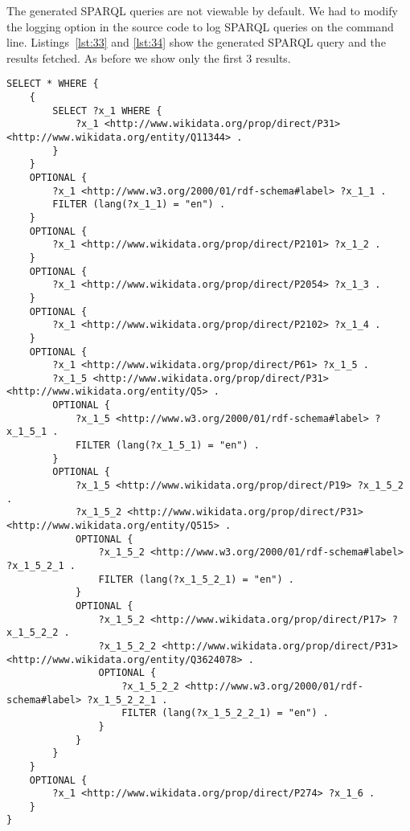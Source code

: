 The generated SPARQL queries are not viewable by default. We had to modify the logging option in the source code to log SPARQL queries on the command line. Listings~\ref{lst:33} and \ref{lst:34} show the generated SPARQL query and the results fetched. As before we show only the first 3 results. 

\begin{minipage}{\linewidth}
\begin{lstlisting}[columns=fullflexible, label=lst:33, caption={Generated SPARQL Query}, language=SPARQL]
SELECT * WHERE { 
	{ 
		SELECT ?x_1 WHERE { 
			?x_1 <http://www.wikidata.org/prop/direct/P31> <http://www.wikidata.org/entity/Q11344> . 
		}  
	}  
	OPTIONAL { 
		?x_1 <http://www.w3.org/2000/01/rdf-schema#label> ?x_1_1 .
		FILTER (lang(?x_1_1) = "en") .  
	}  
	OPTIONAL { 
		?x_1 <http://www.wikidata.org/prop/direct/P2101> ?x_1_2 . 
	}  
	OPTIONAL { 
		?x_1 <http://www.wikidata.org/prop/direct/P2054> ?x_1_3 . 
	}  
	OPTIONAL { 
		?x_1 <http://www.wikidata.org/prop/direct/P2102> ?x_1_4 . 
	}  
	OPTIONAL { 
		?x_1 <http://www.wikidata.org/prop/direct/P61> ?x_1_5 .
		?x_1_5 <http://www.wikidata.org/prop/direct/P31> <http://www.wikidata.org/entity/Q5> . 
		OPTIONAL { 
			?x_1_5 <http://www.w3.org/2000/01/rdf-schema#label> ?x_1_5_1 .
			FILTER (lang(?x_1_5_1) = "en") .  
		}  
		OPTIONAL { 
			?x_1_5 <http://www.wikidata.org/prop/direct/P19> ?x_1_5_2 .
			?x_1_5_2 <http://www.wikidata.org/prop/direct/P31> <http://www.wikidata.org/entity/Q515> . 
			OPTIONAL { 
				?x_1_5_2 <http://www.w3.org/2000/01/rdf-schema#label> ?x_1_5_2_1 .
				FILTER (lang(?x_1_5_2_1) = "en") .  
			}  
			OPTIONAL { 
				?x_1_5_2 <http://www.wikidata.org/prop/direct/P17> ?x_1_5_2_2 .
				?x_1_5_2_2 <http://www.wikidata.org/prop/direct/P31> <http://www.wikidata.org/entity/Q3624078> . 
				OPTIONAL { 
					?x_1_5_2_2 <http://www.w3.org/2000/01/rdf-schema#label> ?x_1_5_2_2_1 .
					FILTER (lang(?x_1_5_2_2_1) = "en") .  
				}  
			}  
		}  
	}  
	OPTIONAL { 
		?x_1 <http://www.wikidata.org/prop/direct/P274> ?x_1_6 . 
	}  
}
\end{lstlisting}
\end{minipage}

